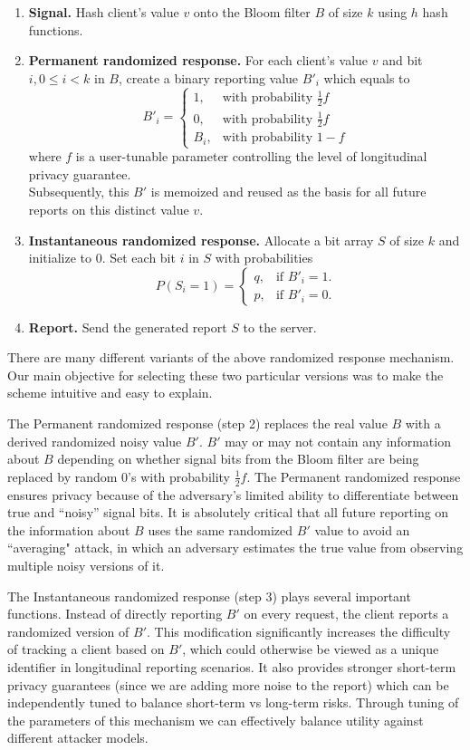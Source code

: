\documentclass{sig-alternate-2013}
\begin{document}
\begin{enumerate}
\item {\bf Signal.} Hash client's value $v$ onto the Bloom filter $B$ of size $k$ using $h$ hash functions.
\item {\bf Permanent randomized response.} For each client's value $v$ and bit $i, 0 \leq i < k$ in $B$, create a binary reporting value $B'_i$ which equals to
$$
B'_i = \begin{cases}
1, & \text{with probability $\frac{1}{2}f$} \\
0, & \text{with probability $\frac{1}{2}f$} \\
B_i, & \text{with probability $1 - f$}
\end{cases}
$$
where $f$ is a user-tunable parameter controlling the level of longitudinal privacy guarantee.\\[1ex]
Subsequently, this $B'$ is memoized and reused as the basis for all future reports on this distinct value $v$.
\item {\bf Instantaneous randomized response.} Allocate a bit array $S$ of size $k$ and initialize to 0. Set each bit $i$ in $S$ with probabilities
$$
P(S_i = 1) = \begin{cases}
q, & \text{if $B'_i = 1$}. \\
p, & \text{if $B'_i = 0$}.
\end{cases}
$$
\item {\bf Report.} Send the generated report $S$ to the server.
\end{enumerate}

There are many different variants of the above randomized response mechanism. Our main objective for selecting these two particular versions was to make the scheme intuitive and easy to explain. 

The Permanent randomized response (step 2) replaces the real value $B$ with a derived randomized noisy value $B'$. $B'$ may or may not contain any information about $B$ depending on whether signal bits from the Bloom filter are being replaced by random 0's with probability $\frac{1}{2}f$. The Permanent randomized response ensures privacy because of the adversary's limited ability to differentiate between true and ``noisy'' signal bits. It is absolutely critical that all future reporting on the information about $B$ uses the same randomized $B'$ value to avoid an ``averaging" attack, in which an adversary estimates the true value from observing multiple noisy versions of it. 

The Instantaneous randomized response (step 3) plays several important functions. Instead of directly reporting $B'$ on every request, the client reports a randomized version of $B'$. This modification significantly increases the difficulty of tracking a client based on $B'$, which could otherwise be viewed as a unique identifier in longitudinal reporting scenarios. It also provides stronger short-term privacy guarantees (since we are adding more noise to the report) which can be independently tuned to balance short-term vs long-term risks. Through tuning of the parameters of this mechanism we can effectively balance utility against different attacker models.
\end{document}
